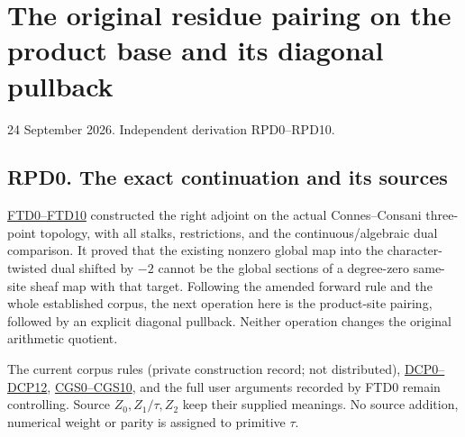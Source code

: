 \section{The original residue pairing on the product base and its
diagonal
pullback}\label{the-original-residue-pairing-on-the-product-base-and-its-diagonal-pullback}

24 September 2026. Independent derivation RPD0--RPD10.

\subsection{RPD0. The exact continuation and its
sources}\label{rpd0.-the-exact-continuation-and-its-sources}

\href{https://github.com/KokunoYumeto/zeta-function-research-reader/blob/main/workbenches/splitzero-tandem/continuations/20260925-full-source-tensor-and-original-divisor/counterfactual/FINITE_TOPOLOGY_DUALIZING_COMPLEX.md}{FTD0--FTD10}
constructed the right adjoint on the actual Connes--Consani three-point
topology, with all stalks, restrictions, and the continuous/algebraic
dual comparison. It proved that the existing nonzero global map into the
character-twisted dual shifted by \(-2\) cannot be the global sections
of a degree-zero same-site sheaf map with that target. Following the
amended forward rule and the whole established corpus, the next
operation here is the product-site pairing, followed by an explicit
diagonal pullback. Neither operation changes the original arithmetic
quotient.

The current corpus rules (private construction record; not distributed),
\href{https://github.com/KokunoYumeto/zeta-function-research-reader/blob/36a82ecca98addb8a98b48204e349737856c7223/workbenches/splitzero-tandem/continuations/20260924-cohomology-weight-and-character-lifts/original-character-lifting/tau_lifting_weights_20260924/SOURCE_CC_DOUBLE_PULLBACK.md}{DCP0--DCP12},
\href{https://github.com/KokunoYumeto/zeta-function-research-reader/blob/36a82ecca98addb8a98b48204e349737856c7223/workbenches/splitzero-tandem/continuations/20260924-cohomology-weight-and-character-lifts/original-character-lifting/tau_lifting_weights_20260924/SOURCE_COEFFICIENT_GLUE.md}{CGS0--CGS10},
and the full user arguments recorded by FTD0 remain controlling. Source
\(Z_0,Z_1/\tau,Z_2\) keep their supplied meanings. No source addition,
numerical weight or parity is assigned to primitive \(\tau\).

